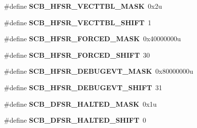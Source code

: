 \begin{DoxyCompactItemize}
\item 
\hypertarget{group___s_c_b___register___masks_ga2492a9706e68dbd594f9b3a03aeb6abb}{}\#define {\bfseries S\+C\+B\+\_\+\+H\+F\+S\+R\+\_\+\+V\+E\+C\+T\+T\+B\+L\+\_\+\+M\+A\+S\+K}~0x2u\label{group___s_c_b___register___masks_ga2492a9706e68dbd594f9b3a03aeb6abb}

\item 
\hypertarget{group___s_c_b___register___masks_ga23b557299a23683a859b514bf835217f}{}\#define {\bfseries S\+C\+B\+\_\+\+H\+F\+S\+R\+\_\+\+V\+E\+C\+T\+T\+B\+L\+\_\+\+S\+H\+I\+F\+T}~1\label{group___s_c_b___register___masks_ga23b557299a23683a859b514bf835217f}

\item 
\hypertarget{group___s_c_b___register___masks_ga7a8e1a0baf849689112d6fc46b69cc66}{}\#define {\bfseries S\+C\+B\+\_\+\+H\+F\+S\+R\+\_\+\+F\+O\+R\+C\+E\+D\+\_\+\+M\+A\+S\+K}~0x40000000u\label{group___s_c_b___register___masks_ga7a8e1a0baf849689112d6fc46b69cc66}

\item 
\hypertarget{group___s_c_b___register___masks_gad550dc779da53b535b671d037df809ad}{}\#define {\bfseries S\+C\+B\+\_\+\+H\+F\+S\+R\+\_\+\+F\+O\+R\+C\+E\+D\+\_\+\+S\+H\+I\+F\+T}~30\label{group___s_c_b___register___masks_gad550dc779da53b535b671d037df809ad}

\item 
\hypertarget{group___s_c_b___register___masks_ga2c38153f3a19482914090d9d1f1b848c}{}\#define {\bfseries S\+C\+B\+\_\+\+H\+F\+S\+R\+\_\+\+D\+E\+B\+U\+G\+E\+V\+T\+\_\+\+M\+A\+S\+K}~0x80000000u\label{group___s_c_b___register___masks_ga2c38153f3a19482914090d9d1f1b848c}

\item 
\hypertarget{group___s_c_b___register___masks_gae21e5892682405886d893868b824824a}{}\#define {\bfseries S\+C\+B\+\_\+\+H\+F\+S\+R\+\_\+\+D\+E\+B\+U\+G\+E\+V\+T\+\_\+\+S\+H\+I\+F\+T}~31\label{group___s_c_b___register___masks_gae21e5892682405886d893868b824824a}

\item 
\hypertarget{group___s_c_b___register___masks_ga68d1b868063cb70eb3bf3af375bea3cd}{}\#define {\bfseries S\+C\+B\+\_\+\+D\+F\+S\+R\+\_\+\+H\+A\+L\+T\+E\+D\+\_\+\+M\+A\+S\+K}~0x1u\label{group___s_c_b___register___masks_ga68d1b868063cb70eb3bf3af375bea3cd}

\item 
\hypertarget{group___s_c_b___register___masks_ga5715d28eed87f24337cf4391a1d65e41}{}\#define {\bfseries S\+C\+B\+\_\+\+D\+F\+S\+R\+\_\+\+H\+A\+L\+T\+E\+D\+\_\+\+S\+H\+I\+F\+T}~0\label{group___s_c_b___register___masks_ga5715d28eed87f24337cf4391a1d65e41}


\end{DoxyCompactItemize}
